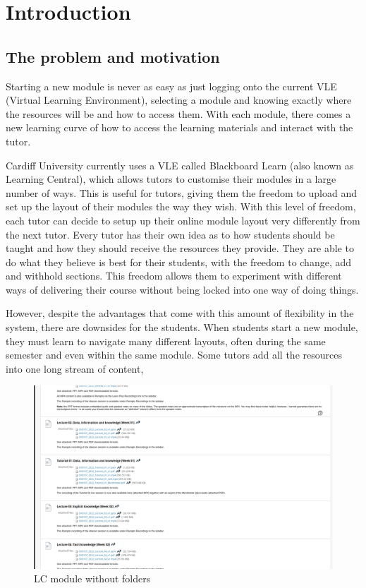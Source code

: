 \chapter{Introduction}

\section{The problem and motivation}

Starting a new module is never as easy as just logging onto the current VLE (Virtual Learning Environment), selecting a module and knowing exactly where the resources will be and how to access them. With each module, there comes a new learning curve of how to access the learning materials and interact with the tutor. 

Cardiff University currently uses a VLE called Blackboard Learn (also known as Learning Central), which allows tutors to customise their modules in a large number of ways. This is useful for tutors, giving them the freedom to upload and set up the layout of their modules the way they wish. With this level of freedom, each tutor can decide to setup up their online module layout very differently from the next tutor. Every tutor has their own idea as to how students should be taught and how they should receive the resources they provide. They are able to do what they believe is best for their students, with the freedom to change, add and withhold sections. This freedom allows them to experiment with different ways of delivering their course without being locked into one way of doing things.

However, despite the advantages that come with this amount of flexibility in the system, there are downsides for the students. When students start a new module, they must learn to navigate many different layouts, often during the same semester and even within the same module. Some tutors add all the resources into one long stream of content,

\begin{figure}[H]
    \centering
    \includegraphics[scale=0.20]{images/LC screenshots/LC module without folders.png}
    \caption{LC module without folders}
    \label{fig:my_label}
\end{figure}

